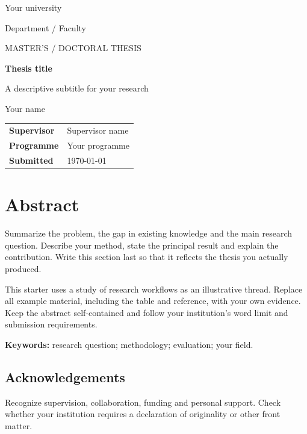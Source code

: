 \documentclass[11pt,a4paper,oneside]{report}
\newcommand{\thesistitle}{Thesis title}
\newcommand{\thesissubtitle}{A descriptive subtitle for your research}
\newcommand{\authorname}{Your name}
\newcommand{\university}{Your university}
\newcommand{\department}{Department / Faculty}
\newcommand{\degree}{Master's / Doctoral thesis}
\newcommand{\supervisor}{Supervisor name}
\begin{document}
\hypersetup{pageanchor=false}
\begin{titlepage}
\raggedright
{\large\sffamily\color{accent}\university}\par
{\small\department}\par
\vspace{28mm}
{\small\sffamily\color{muted}\MakeUppercase{\degree}}\par
\vspace{8mm}
{\Huge\bfseries\thesistitle\par}
\vspace{6mm}
{\Large\color{muted}\thesissubtitle\par}
\vspace{14mm}
{\large\authorname}\par
\vfill
\begin{tabular}{@{}ll@{}}
\textbf{Supervisor} & \supervisor\\[5pt]
\textbf{Programme} & Your programme\\[5pt]
\textbf{Submitted} & \today
\end{tabular}
\end{titlepage}
\hypersetup{pageanchor=true}
\chapter*{Abstract}
Summarize the problem, the gap in existing knowledge and the main research
question. Describe your method, state the principal result and explain the
contribution. Write this section last so that it reflects the thesis you
actually produced.

This starter uses a study of research workflows as an illustrative thread.
Replace all example material, including the table and reference, with your
own evidence. Keep the abstract self-contained and follow your institution's
word limit and submission requirements.

\textbf{Keywords:} research question; methodology; evaluation; your field.
\vspace{12mm}
\section*{Acknowledgements}
Recognize supervision, collaboration, funding and personal support. Check whether
your institution requires a declaration of originality or other front matter.
\tableofcontents
\clearpage
{}
\end{document}
